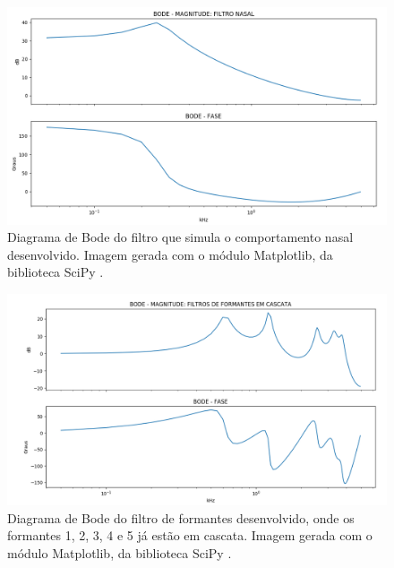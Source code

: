 \documentclass[
  12pt,       
  openright,      
  twoside,      
  a4paper,      
  english,      
  french,       
  spanish,      
  brazil,     
  ]{abntex2}
\begin{document}
\begin{figure}
\includegraphics[width=\textwidth,keepaspectratio]{imagens/bode_nasal.PNG}
\caption{Diagrama de Bode do filtro que simula o comportamento nasal desenvolvido. Imagem gerada com o módulo Matplotlib, da biblioteca SciPy \cite{scipy}.}
\label{fig:filtroNasal}
\end{figure}

\begin{figure}
\includegraphics[width=\textwidth,keepaspectratio]{imagens/bode_formantes.PNG}
\caption{Diagrama de Bode do filtro de formantes desenvolvido, onde os formantes 1, 2, 3, 4 e 5 já estão em cascata. Imagem gerada com o módulo Matplotlib, da biblioteca SciPy \cite{scipy}.}
\label{fig:filtroFormantes}
\end{figure}
\end{document}
